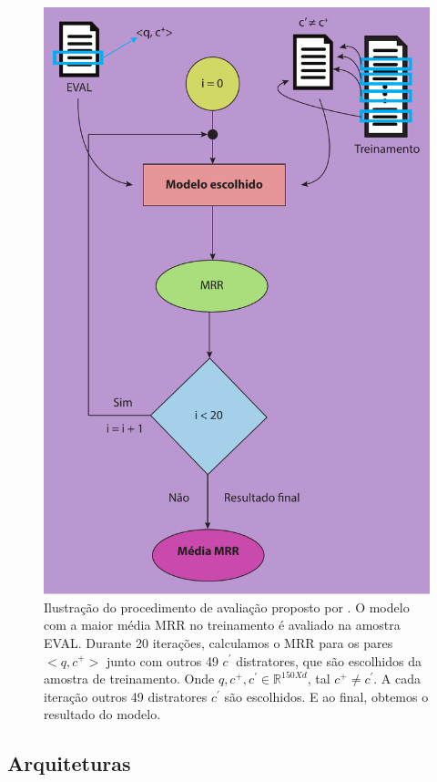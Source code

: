 \begin{figure}[h]
\centering
\includegraphics[height=1\textwidth]{figuras/cap-experimento/final_evaluation_process.pdf}
\caption{Ilustração do procedimento de avaliação proposto por \cite{iyer-etal-2016-summarizing}. O modelo com a maior média MRR no treinamento é avaliado na amostra EVAL. Durante 20 iterações, calculamos o MRR para os pares $<q, c^{+}>$ junto com outros 49 $c^{'}$ distratores, que são escolhidos da amostra de treinamento. Onde $q, c^{+}, c^{'} \in \mathbb{R}^{150 X d}$, tal $c^{+} \neq c^{'}$. A cada iteração outros 49 distratores $c^{'}$ são escolhidos. E ao final, obtemos o resultado do modelo.}
\label{fig:final-evaluation-process}
\end{figure}



\subsection{Arquiteturas}

